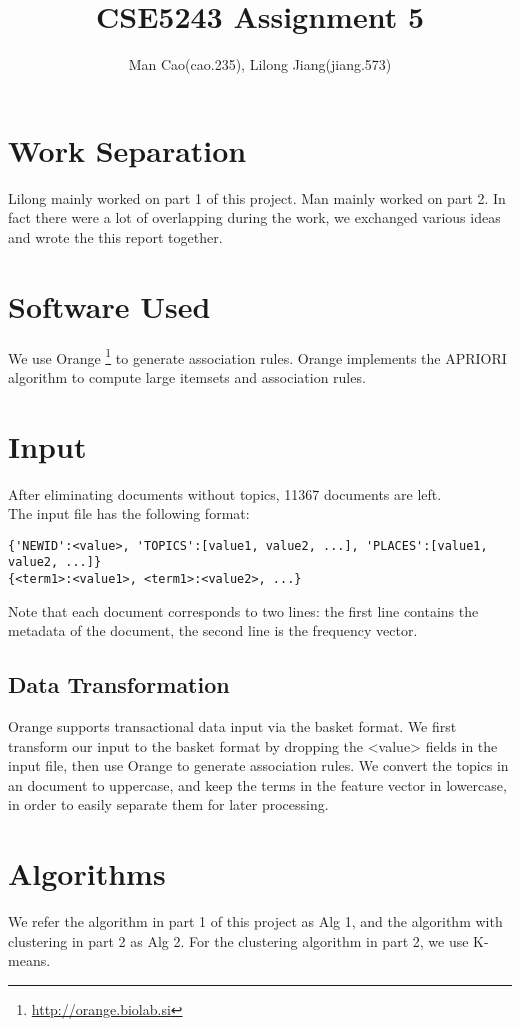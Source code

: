\documentclass{article}
\begin{document}
\title{CSE5243 Assignment 5}
\author{Man Cao(cao.235), Lilong Jiang(jiang.573)}
\maketitle

\section{Work Separation}
Lilong mainly worked on part 1 of this project. Man mainly worked on
part 2. In fact there were a lot of overlapping during the
work, we exchanged various ideas and wrote the this report together.

\section{Software Used}
We use Orange \footnote{\url{http://orange.biolab.si}} to generate association
rules.
Orange implements the APRIORI algorithm to compute large itemsets and association
rules.

\section{Input}
After eliminating documents without topics, 11367 documents are left.\\
The input file has the following format:
\begin{verbatim}
{'NEWID':<value>, 'TOPICS':[value1, value2, ...], 'PLACES':[value1, value2, ...]}
{<term1>:<value1>, <term1>:<value2>, ...}
\end{verbatim}
Note that each document corresponds to two lines: the first line contains the
metadata of the document, the second line is the frequency vector.

\subsection{Data Transformation}
Orange supports transactional data input via the basket format. We first
transform our input to the basket format by dropping the <value> fields in
the input file, then use Orange to generate association rules.
We convert the topics in an document to uppercase, and keep the terms in
the feature vector in lowercase, in order to easily separate them for later
processing.

\section{Algorithms}
We refer the algorithm in part 1 of this project as Alg 1, and the
algorithm with clustering in part 2 as Alg 2. For the clustering algorithm in
part 2, we use K-means.
\end{document}
